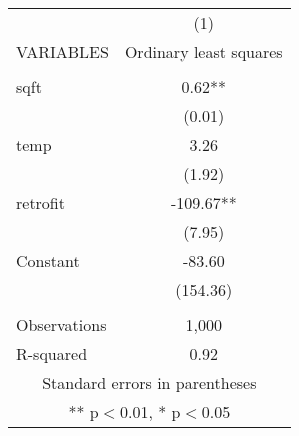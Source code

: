 \begin{tabular}{lc} \hline
 & (1) \\
VARIABLES & Ordinary least squares \\ \hline
 &  \\
sqft & 0.62** \\
 & (0.01) \\
temp & 3.26 \\
 & (1.92) \\
retrofit & -109.67** \\
 & (7.95) \\
Constant & -83.60 \\
 & (154.36) \\
 &  \\
Observations & 1,000 \\
 R-squared & 0.92 \\ \hline
\multicolumn{2}{c}{ Standard errors in parentheses} \\
\multicolumn{2}{c}{ ** p$<$0.01, * p$<$0.05} \\
\end{tabular}
